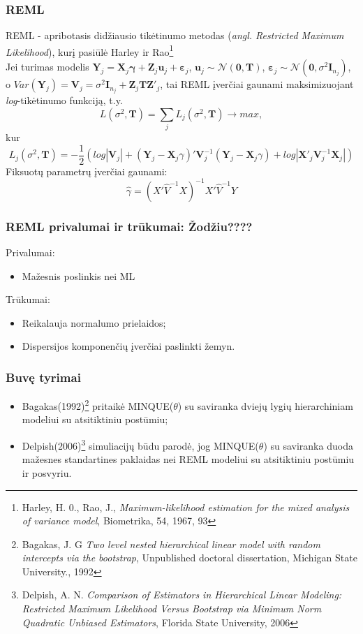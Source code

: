 \documentclass[utf8,hyperref={unicode,pdftex}]{beamer}
\begin{document}
\begin{frame}
\frametitle{REML}
REML - apribotasis didžiausio tikėtinumo metodas (\textit{angl. Restricted Maximum Likelihood}), kurį pasiūlė Harley ir Rao\footnote{Harley, H. 0., Rao, J., \textit{Maximum-likelihood estimation for the mixed analysis of variance model}, Biometrika, 54, 1967, 93}\\
Jei turimas modelis $\mathbf{Y}_j=\mathbf{X}_j\boldsymbol{\gamma}+\mathbf{Z}_j\mathbf{u}_j+\boldsymbol{\varepsilon}_j$, $\mathbf{u}_j\sim \mathcal{N}(\mathbf{0}, \mathbf{T})$, $\boldsymbol{\varepsilon}_j\sim \mathcal{N}(\mathbf{0}, \sigma^2 \mathbf{I}_{n_j})$, o $Var(\mathbf{Y}_j)=\mathbf{V}_j=\sigma^2 \mathbf{I}_{n_j} + \mathbf{Z}_j\mathbf{T}\mathbf{Z}'_j$, tai REML įverčiai gaunami maksimizuojant \textit{log}-tikėtinumo funkciją, t.y.
\[
L(\sigma^2, \mathbf{T})=\sum_j L_j(\sigma^2, \mathbf{T}) \to max,
\]
kur
\[
L_j(\sigma^2, \mathbf{T})=-\frac{1}{2}\left( log|\mathbf{V}_j|+(\mathbf{Y}_j-\mathbf{X}_j\gamma)'\mathbf{V}_j^{-1}(\mathbf{Y}_j-\mathbf{X}_j\gamma)+log|\mathbf{X}'_j\mathbf{V}_j^{-1}\mathbf{X}_j|\right)
\]
Fiksuotų parametrų įverčiai gaunami:
\[\hat{\gamma}=(X'\hat{V}^{-1}X)^{-1}X'\hat{V}^{-1}Y\]
\end{frame}

\begin{frame}
\frametitle{REML privalumai ir trūkumai: Žodžiu????}
Privalumai:
\begin{itemize}
\item Mažesnis poslinkis nei ML
\end{itemize}
Trūkumai:
\begin{itemize}
\item Reikalauja normalumo prielaidos;
\item Dispersijos komponenčių įverčiai paslinkti žemyn.
\end{itemize}
\end{frame}
\begin{frame}
\frametitle{Buvę tyrimai}
\begin{itemize}
\item Bagakas(1992)\footnote{Bagakas, J. G  \textit{ Two level nested hierarchical linear model with random intercepts
via the bootstrap}, Unpublished doctoral dissertation, Michigan State University., 1992} pritaikė MINQUE($\theta$) su saviranka dviejų lygių hierarchiniam modeliui su atsitiktiniu postūmiu;
\item Delpish(2006)\footnote{Delpish, A. N.  \textit{Comparison of Estimators in Hierarchical Linear Modeling: Restricted Maximum Likelihood Versus Bootstrap via Minimum Norm Quadratic Unbiased Estimators}, Florida State University, 2006} simuliacijų būdu parodė, jog MINQUE($\theta$) su saviranka duoda mažesnes standartines paklaidas nei REML modeliui su atsitiktiniu postūmiu ir posvyriu.
\end{itemize}
\end{frame}
\end{document}
